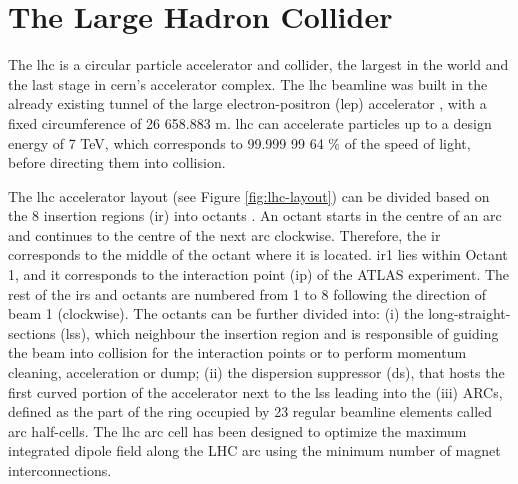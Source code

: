 \documentclass[encoding=utf8,british]{tumphthesis}
\begin{document}
\section{The Large Hadron Collider}

The \acrshort{lhc} is a circular particle accelerator and collider, the largest in the world and the last stage in \acrshort{cern}'s accelerator complex. The \acrshort{lhc} beamline was built in the already existing tunnel of the  large electron-positron (\acrshort{lep}) accelerator \cite{LEP}, with a fixed circumference of 26 658.883 m. \acrshort{lhc} can accelerate particles up to a design energy of 7 TeV, which corresponds to 99.999 99 64 \% of the speed of light, before directing them into collision. 


\begin{minipage}[t]{0.42\linewidth}

The \acrshort{lhc} accelerator layout (see Figure \ref{fig:lhc-layout}) can be divided based on the 8 insertion regions (\acrshort{ir}) into octants \cite{LHC-design-report}. An octant starts in the centre of an arc and continues to the centre of the next arc clockwise. Therefore, the \acrshort{ir} corresponds to the middle of the octant where it is located. \acrshort{ir}1 lies within Octant 1, and it corresponds to the interaction point (\acrshort{ip}) of the ATLAS experiment. The rest of the \acrshort{ir}s and octants are numbered from 1 to 8 following the direction of beam 1 (clockwise). The octants can be further divided into: (i) the long-straight-sections (\acrshort{lss}), which neighbour the insertion region and is responsible of guiding the beam into collision for the interaction points or to perform momentum cleaning, acceleration or dump; (ii) the dispersion suppressor (\acrshort{ds}), that hosts the first curved portion of the accelerator next to the \acrshort{lss} leading into the (iii) ARCs, defined as the part of the ring occupied by 23 regular beamline elements called arc half-cells. The \acrshort{lhc} arc cell has been designed to optimize the maximum integrated dipole field along the LHC arc using the minimum number of magnet interconnections. 
\end{minipage}
\hfill
\end{document}

